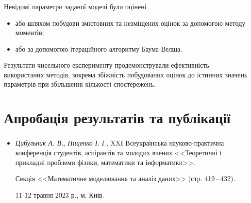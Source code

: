 \documentclass[12pt,mathserif]{beamer}
\theoremstyle{plain}
\begin{document}
\begin{frame}
    \frametitle{\insertsection} 
    Невідомі параметри заданої моделі були оцінені 
    \begin{itemize}
        \item або шляхом побудови змістовних та незміщених оцінок за допомогою методу моментів;
        \item або за допомогою ітераційного алгоритму Баума-Велша.
    \end{itemize}
    \vspace{0.5cm}

    Результати чисельного експерименту продемонстрували ефективність використаних методів, зокрема збіжність побудованих оцінок до істинних значень параметрів при збільшенні кількості спостережень.
\end{frame}

\section*{Апробація результатів та публікації}

\begin{frame}
    \frametitle{\insertsection}
    \begin{itemize}
        \item \textit{Цибульник А. В., Ніщенко І. І.,} XXI Всеукраїнська науково-практична конференція студентів, аспірантів та молодих вчених <<Теоретичні i прикладні проблеми фізики, математики та інформатики>>.
        
        \vspace{4mm} Секція <<Математичне моделювання та аналіз даних>> (стр. 419\,--\,432).
        
        \vspace{4mm} 11-12 травня 2023 р., м. Київ.
    \end{itemize}
\end{frame}
\end{document}
